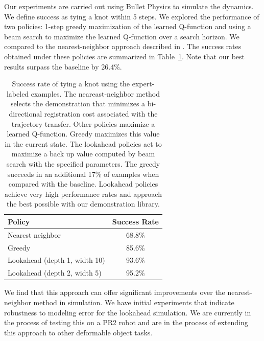 \documentclass[conference]{IEEEtran}
\begin{document}
Our experiments are carried out using Bullet Physics to simulate the
dynamics. We define success as tying a knot within 5 steps. We
explored the performance of two policies: 1-step greedy maximization
of the learned Q-function and using a beam search to maximize the
learned Q-function over a search horizon. We compared to the nearest-neighbor
approach described in \citet{Schulmanetal_ISRR2013}.  The
success rates obtained under these policies are summarized in
Table~\ref{table:performance}. Note that our best results surpass the
baseline by 26.4\%.
\begin{table}
  \centering
  \normalsize
  \begin{tabular}{lc}
    \toprule
      Policy & Success Rate\\
    \midrule
      Nearest neighbor \cite{Schulmanetal_ISRR2013} & 68.8\% \\
    \midrule
      Greedy & 85.6\% \\
      Lookahead (depth 1, width 10) & 93.6\% \\
      Lookahead (depth 2, width 5) & 95.2\% \\
    \bottomrule
  \end{tabular}
  \caption{Success rate of tying a knot using the expert-labeled
    examples. The neareast-neighbor method selects the demonstration
    that minimizes a bi-directional registration cost associated with
    the trajectory transfer.  Other policies maximize a learned
    Q-function. Greedy maximizes this value in the current state. The
    lookahead policies act to maximize a back up value computed by
    beam search with the specified parameters. The greedy succeeds in
    an additional 17\% of examples when compared with the
    baseline. Lookahead policies achieve very high performance rates
    and approach the best possible with our demonstration library.}
  \label{table:performance}
\end{table}

We find that this approach can offer significant improvements over the
nearest-neighbor method in simulation. We have initial experiments
that indicate robustness to modeling error for the lookahead
simulation. We are currently in the process of testing this on a
PR2 robot and are in the process of extending this approach to other deformable
object tasks. 

\maketitle



\footnotesize

\end{document}
